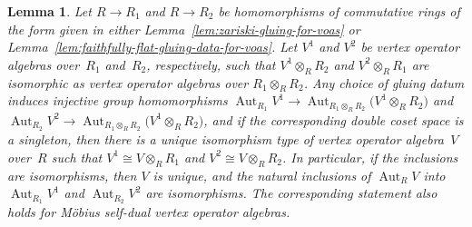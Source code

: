 \documentclass[pdftex]{sigma}
\DeclareMathOperator{\Aut}{Aut}
\newtheorem{lem}[thm]{Lemma}
\theoremstyle{definition}
\begin{document}
\begin{lem} \label{lem:unique-voa-from-descent}Let $R \to R_1$ and $R \to R_2$ be homomorphisms of commutative rings of the form given in either Lemma~{\rm \ref{lem:zariski-gluing-for-voas}} or Lemma~{\rm \ref{lem:faithfully-flat-gluing-data-for-voas}}. Let $V^1$ and $V^2$ be vertex operator algebras over~$R_1$ and~$R_2$, respectively, such that $V^1 \otimes_{R} R_2$ and $V^2 \otimes_{R} R_1$ are isomorphic as vertex operator algebras over $R_1 \otimes_{R} R_2$. Any choice of gluing datum induces injective group homomorphisms $\Aut_{R_1} V^1 \to \Aut_{R_1 \otimes_{R} R_2} \big(V^1 \otimes_{R} R_2\big)$ and $\Aut_{R_2} V^2 \to \Aut_{R_1 \otimes_{R} R_2} \big(V^1 \otimes_{R} R_2\big)$, and if the corresponding double coset space is a singleton, then there is a unique isomorphism type of vertex operator algebra~$V$ over~$R$ such that $V^1 \cong V \otimes_{R} R_1$ and $V^2 \cong V \otimes_{R} R_2$. In particular, if the inclusions are isomorphisms, then $V$ is unique, and the natural inclusions of $\Aut_R V$ into $\Aut_{R_1} V^1$ and $\Aut_{R_2} V^2$ are isomorphisms. The corresponding statement also holds for M\"obius self-dual vertex operator algebras.
\end{lem}
\end{document}
